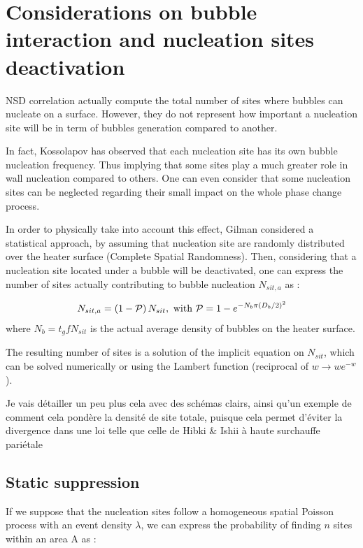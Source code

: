 \section{Considerations on bubble interaction and nucleation sites deactivation}

NSD correlation actually compute the total number of sites where bubbles can nucleate on a surface. However, they do not represent how important a nucleation site will be in term of bubbles generation compared to another. 

\npar
In fact, Kossolapov has observed that each nucleation site has its own bubble nucleation frequency. Thus implying that some sites play a much greater role in wall nucleation compared to others. One can even consider that some nucleation sites can be neglected regarding their small impact on the whole phase change process.

\npar

In order to physically take into account this effect, Gilman considered a statistical approach, by assuming that nucleation site are randomly distributed over the heater surface (Complete Spatial Randomness). Then, considering that a nucleation site located under a bubble will be deactivated, one can express the number of sites actually contributing to bubble nucleation $N_{sit,a}$ as :


\begin{align}
N_{sit,a}=\parth{1-\mathcal{P}}N_{sit},\ \text{with}\ \mathcal{P}=1-e^{-N_{b}\pi \parth{D_{b}/2}^{2}}
\end{align}
where $N_{b}=t_{g}fN_{sit}$ is the actual average density of bubbles on the heater surface.

\npar

The resulting number of sites is a solution of the implicit equation on $N_{sit}$, which can be solved numerically or using the Lambert function (reciprocal of $w\rightarrow we^{-w}$).

\npar

{\color{red} Je vais détailler un peu plus cela avec des schémas clairs, ainsi qu'un exemple de comment cela pondère la densité de site totale, puisque cela permet d'éviter la divergence dans une loi telle que celle de Hibki \& Ishii à haute surchauffe pariétale} 


\subsection{Static suppression}

If we suppose that the nucleation sites follow a homogeneous spatial Poisson process with an event density $\lambda$, we can express the probability of finding $n$ sites within an area A as :

